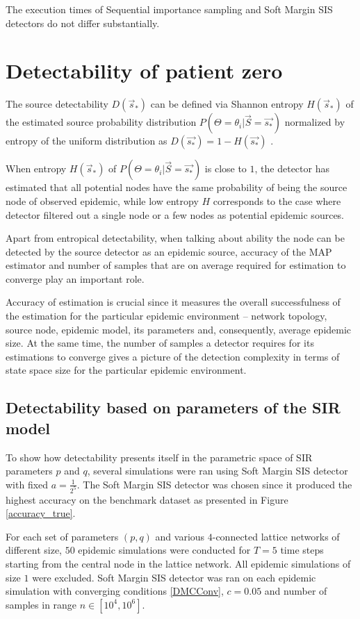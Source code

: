 \documentclass[times, utf8, diplomski]{fer}
\begin{document}
The execution times of Sequential importance sampling and Soft Margin SIS detectors do not differ substantially.

\chapter{Detectability of patient zero} 
\label{Det}

The source detectability $D(\vec s_*)$ can be defined via Shannon entropy $H(\vec s_*)$  of the estimated source probability distribution $P(\Theta = \theta_i |\vec{S} = \vec{s_*})$ normalized by entropy of the uniform distribution  as  $D(\vec{s_*}) = 1 - H(\vec{s_*})$ \cite{Nino}.

 When entropy $H(\vec s_*)$ of $P(\Theta = \theta_i | \vec{S} = \vec{s_*})$ is close to $1$, the detector has estimated that all potential nodes have the same probability of being the source node of observed epidemic, while low entropy $H$ corresponds to the case where  detector filtered out a single node or a few nodes as  potential epidemic sources. 

Apart from entropical detectability,  when talking about ability the node can be detected by the source detector as an epidemic source, accuracy of the MAP estimator and number of  samples that are on average required for  estimation to converge play an important role.

Accuracy of  estimation is crucial since it measures the overall successfulness of the estimation  for the particular epidemic environment -- network topology, source node, epidemic model, its parameters and, consequently, average epidemic size. At the same time, the number of samples a detector requires for its estimations to converge gives a picture of the detection complexity in terms of state space size for the particular epidemic environment.

\section{Detectability based on parameters of the SIR model}

To show how detectability presents itself in the parametric space of SIR parameters $p$ and $q$, several simulations were ran using Soft Margin SIS detector with fixed $a=\frac{1}{2^5}$. The Soft Margin SIS detector was chosen since it produced the highest accuracy on the benchmark dataset as presented in Figure \ref{accuracy_true}. 

For each set of parameters $(p, q)$ and various $4$-connected lattice networks of different size, $50$ epidemic simulations were conducted  for $T=5$ time steps starting from the central node in the lattice network. All epidemic simulations of size $1$ were excluded. Soft Margin SIS detector was ran on each epidemic simulation with converging conditions \ref{DMCConv}, $c=0.05$ and number of samples in range $n \in [10^4, 10^6]$.
\end{document}
